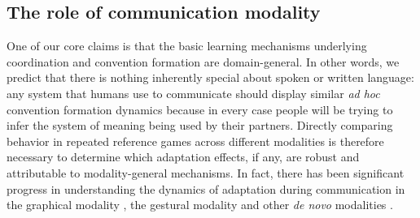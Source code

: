 \subsection{The role of communication modality}

One of our core claims is that the basic learning mechanisms underlying coordination and convention formation are domain-general.
In other words, we predict that there is nothing inherently special about spoken or written language: any system that humans use to communicate should display similar \emph{ad hoc} convention formation dynamics because in every case people will be trying to infer the system of meaning being used by their partners. 
Directly comparing behavior in repeated reference games across different modalities is therefore necessary to determine which adaptation effects, if any, are robust and attributable to modality-general mechanisms.
In fact, there has been significant progress in understanding the dynamics of adaptation during communication in the  graphical modality \cite{GarrodFayLeeOberlanderMacLeod07_GraphicalSymbolSystems,TheisenEtAl10_SystematicityArbitrariness,hawkins2019disentangling}, the gestural modality \cite{FayListerEllisonGoldinMeadow13_GestureBeatsVocalization,motamedi2019evolving,bohn2019young} and other \emph{de novo} modalities \cite{Galantucci05_EmergenceOfCommunication,RobertsGalantucci12_DualityOfPatterning,RobertsEtAl15_IconocityOnCombinatoriality,VerhoefRobertsDingemanse15_Iconicity,VerhoefEtAl16_TemporalLanguage,kempe2019adults}.

